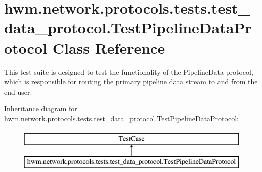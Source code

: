\hypertarget{classhwm_1_1network_1_1protocols_1_1tests_1_1test__data__protocol_1_1_test_pipeline_data_protocol}{\section{hwm.\-network.\-protocols.\-tests.\-test\-\_\-data\-\_\-protocol.\-Test\-Pipeline\-Data\-Protocol Class Reference}
\label{classhwm_1_1network_1_1protocols_1_1tests_1_1test__data__protocol_1_1_test_pipeline_data_protocol}
}


This test suite is designed to test the functionality of the Pipeline\-Data protocol, which is responsible for routing the primary pipeline data stream to and from the end user.  


Inheritance diagram for hwm.\-network.\-protocols.\-tests.\-test\-\_\-data\-\_\-protocol.\-Test\-Pipeline\-Data\-Protocol\-:\begin{figure}[H]
\begin{center}
\leavevmode
\includegraphics[height=2.000000cm]{classhwm_1_1network_1_1protocols_1_1tests_1_1test__data__protocol_1_1_test_pipeline_data_protocol}
\end{center}
\end{figure}
